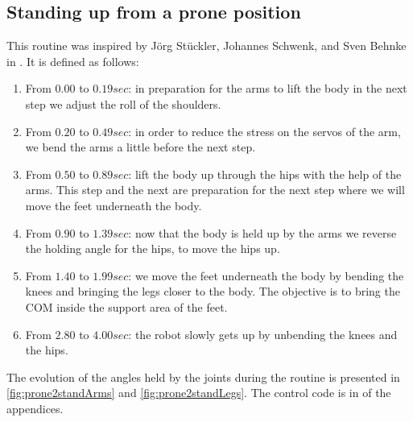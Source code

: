 \subsection{Standing up from a prone position}
This routine was inspired by Jörg Stückler, Johannes Schwenk, and Sven Behnke in \cite{Stuckler06}. It is defined as follows:\begin{enumerate}
\item From $0.00$ to $0.19sec$: in preparation for the arms to lift the body in the next step we adjust the roll of the shoulders.

\item From $0.20$ to $0.49sec$: in order to reduce the stress on the servos of the arm, we bend the arms a little before the next step.

\item From $0.50$ to $0.89sec$: lift the body up through the hips with the help of the arms. This step and the next are preparation for the next step where we will move the feet underneath the body.

\item From $0.90$ to $1.39sec$: now that the body is held up by the arms we reverse the holding angle for the hips, to move the hips up. 

\item From $1.40$ to $1.99sec$:  we move the feet underneath the body by bending the knees and bringing the legs closer to the body. The objective is to bring the COM inside the support area of the feet.

\item From $2.80$ to $4.00sec$: the robot slowly gets up by unbending the knees and the hips. 
\end{enumerate}

The evolution of the angles held by the joints during the routine is presented in \cref{fig:prone2standArms} and \cref{fig:prone2standLegs}. The control code is in  of the appendices.

